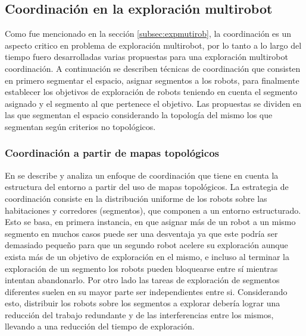 \subsection{Coordinación en la exploración multirobot}
Como fue mencionado en la sección \ref{subsec:expmutirob}, la coordinación es un aspecto critico en problema de exploración multirobot, por lo tanto a lo largo del tiempo fuero desarrolladas varias propuestas para una exploración multirobot coordinación. A continuación se describen técnicas de coordinación que consisten en primero segmentar el espacio, asignar segmentos a los robots, para finalmente establecer los objetivos de exploración de robots teniendo en cuenta el segmento asignado y el segmento al que pertenece el objetivo. Las propuestas se dividen en las que segmentan el espacio considerando la topología del mismo los que segmentan según criterios no topológicos.
\subsubsection{Coordinación a partir de mapas topológicos}

En \cite{wurm2008coordinated} se describe y analiza un enfoque de coordinación que tiene en cuenta la estructura del entorno a partir del uso de mapas topológicos. La estrategia de coordinación consiste en la distribución uniforme de los robots sobre las habitaciones y corredores (segmentos), que componen a un entorno estructurado. Esto se basa, en primera instancia, en que asignar más de un robot a un mismo segmento en muchos casos puede ser una desventaja ya que este podría ser demasiado pequeño para que un segundo robot acelere su exploración aunque exista más de un objetivo de exploración en el mismo, e incluso al terminar la exploración de un segmento los robots pueden bloquearse entre sí mientras intentan abandonarlo. Por otro lado las tareas de exploración de segmentos diferentes suelen en su mayor parte ser independientes entre si. Considerando esto, distribuir los robots sobre los segmentos a explorar debería lograr una reducción del trabajo redundante y de las interferencias entre los mismos, llevando a una reducción del tiempo de exploración.

